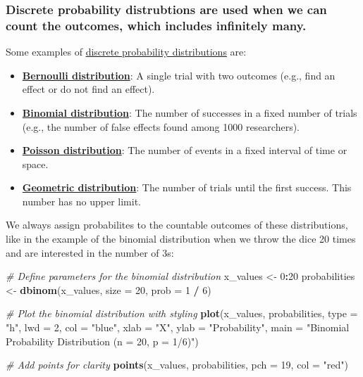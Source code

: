 \documentclass[
]{book}
\newenvironment{Shaded}{\begin{snugshade}}{\end{snugshade}}
\newcommand{\AttributeTok}[1]{\textcolor[rgb]{0.13,0.29,0.53}{#1}}
\newcommand{\CommentTok}[1]{\textcolor[rgb]{0.56,0.35,0.01}{\textit{#1}}}
\newcommand{\DecValTok}[1]{\textcolor[rgb]{0.00,0.00,0.81}{#1}}
\newcommand{\FunctionTok}[1]{\textcolor[rgb]{0.13,0.29,0.53}{\textbf{#1}}}
\newcommand{\NormalTok}[1]{#1}
\newcommand{\OtherTok}[1]{\textcolor[rgb]{0.56,0.35,0.01}{#1}}
\newcommand{\SpecialCharTok}[1]{\textcolor[rgb]{0.81,0.36,0.00}{\textbf{#1}}}
\newcommand{\StringTok}[1]{\textcolor[rgb]{0.31,0.60,0.02}{#1}}
\providecommand{\tightlist}{%
  \setlength{\itemsep}{0pt}\setlength{\parskip}{0pt}}
\begin{document}
\subsubsection{Discrete probability distrubtions are used when we can count the outcomes, which includes infinitely many.}\label{discrete_probability_distributions}

Some examples of \href{https://en.wikipedia.org/wiki/Probability_distribution\#Discrete_probability_distribution}{discrete probability distributions} are:

\begin{itemize}
\tightlist
\item
  \textbf{\href{https://en.wikipedia.org/wiki/Bernoulli_distribution}{Bernoulli distribution}}: A single trial with two outcomes (e.g., find an effect or do not find an effect).
\item
  \textbf{\href{https://en.wikipedia.org/wiki/Binomial_distribution}{Binomial distribution}}: The number of successes in a fixed number of trials (e.g., the number of false effects found among 1000 researchers).
\item
  \textbf{\href{https://en.wikipedia.org/wiki/Poisson_distribution}{Poisson distribution}}: The number of events in a fixed interval of time or space.
\item
  \textbf{\href{https://en.wikipedia.org/wiki/Geometric_distribution}{Geometric distribution}}: The number of trials until the first success. This number has no upper limit.
\end{itemize}

We always assign probabilites to the countable outcomes of these distributions, like in the example of the binomial distribution when
we throw the dice 20 times and are interested in the number of 3s:

\begin{Shaded}
\begin{Highlighting}[]
\CommentTok{\# Define parameters for the binomial distribution}
\NormalTok{x\_values }\OtherTok{\textless{}{-}} \DecValTok{0}\SpecialCharTok{:}\DecValTok{20}
\NormalTok{probabilities }\OtherTok{\textless{}{-}} \FunctionTok{dbinom}\NormalTok{(x\_values, }\AttributeTok{size =} \DecValTok{20}\NormalTok{, }\AttributeTok{prob =} \DecValTok{1} \SpecialCharTok{/} \DecValTok{6}\NormalTok{)}

\CommentTok{\# Plot the binomial distribution with styling}
\FunctionTok{plot}\NormalTok{(x\_values, probabilities, }\AttributeTok{type =} \StringTok{"h"}\NormalTok{, }\AttributeTok{lwd =} \DecValTok{2}\NormalTok{, }\AttributeTok{col =} \StringTok{"blue"}\NormalTok{,}
     \AttributeTok{xlab =} \StringTok{"X"}\NormalTok{, }\AttributeTok{ylab =} \StringTok{"Probability"}\NormalTok{,}
     \AttributeTok{main =} \StringTok{"Binomial Probability Distribution (n = 20, p = 1/6)"}\NormalTok{)}

\CommentTok{\# Add points for clarity}
\FunctionTok{points}\NormalTok{(x\_values, probabilities, }\AttributeTok{pch =} \DecValTok{19}\NormalTok{, }\AttributeTok{col =} \StringTok{"red"}\NormalTok{)}
\end{Highlighting}
\end{Shaded}
\end{document}
